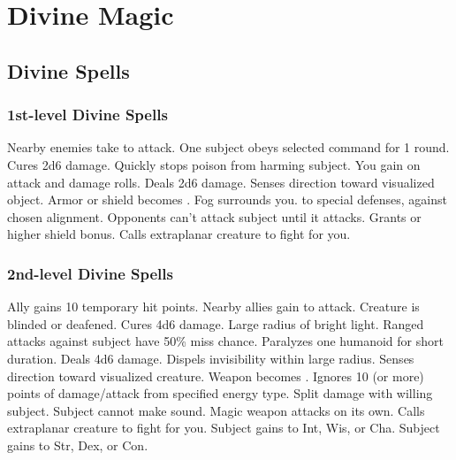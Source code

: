 \section{Divine Magic}\label{Divine Magic}

\subsection{Divine Spells}\label{Divine Spells}

\subsubsection{1st-level Divine Spells}
\begin{spelllist}
   Nearby enemies take  to attack.
   One subject obeys selected command for 1 round.
   Cures 2d6 damage.
   Quickly stops poison from harming subject.
   You gain  on attack and damage rolls.
   Deals 2d6 damage.
   Senses direction toward visualized object.
   Armor or shield becomes .
   Fog surrounds you.
    to special defenses,  against chosen alignment.
   Opponents can't attack subject until it attacks.
   Grants  or higher shield bonus.
   Calls extraplanar creature to fight for you.
\end{spelllist}

\subsubsection{2nd-level Divine Spells}
\begin{spelllist}
   Ally gains 10 temporary hit points.
   Nearby allies gain  to attack.
   Creature is blinded or deafened.
   Cures 4d6 damage.
   Large radius of bright light.
   Ranged attacks against subject have 50\% miss chance.
   Paralyzes one humanoid for short duration.
   Deals 4d6 damage.
   Dispels invisibility within large radius.
   Senses direction toward visualized creature.
   Weapon becomes .
   Ignores 10 (or more) points of damage/attack from specified energy type.
    Split damage with willing subject.
   Subject cannot make sound.
   Magic weapon attacks on its own.
   Calls extraplanar creature to fight for you.
   Subject gains  to Int, Wis, or Cha.
   Subject gains  to Str, Dex, or Con.
\end{spelllist}

